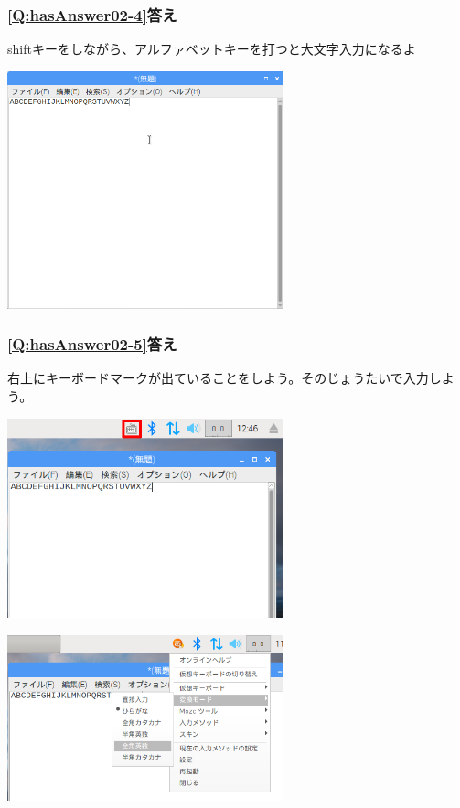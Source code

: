 \documentclass[a4paper,12pt]{jarticle}
\begin{document}
\subsubsection{\bfseries
\ref*{Q:hasAnswer02-4}答え}

shiftキーをしながら、アルファベットキーを打つと大文字入力になるよ


\centering
\includegraphics[width=0.6\textwidth]{textbook-img217.png}
\flushleft

\clearpage\subsubsection{\bfseries
\ref*{Q:hasAnswer02-5}答え}

右上にキーボードマークが出ていることをしよう。そのじょうたいで入力しよう。


\bigskip


\centering
\includegraphics[width=0.6\textwidth]{textbook-img218.png}
\flushleft


\bigskip





\centering
\includegraphics[width=0.6\textwidth]{textbook-img219.png}
\flushleft
\end{document}
